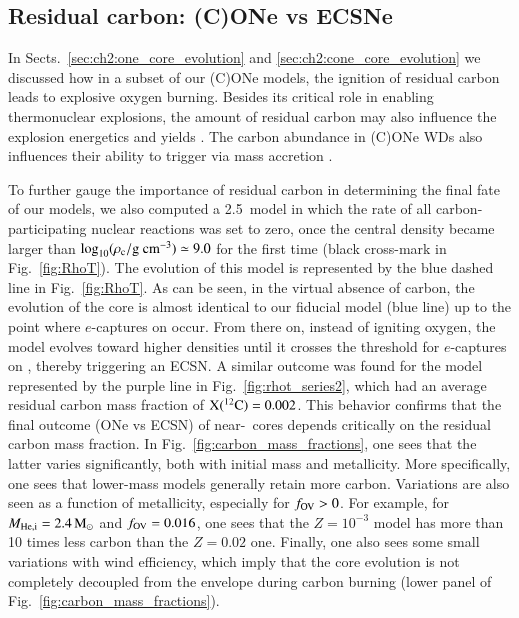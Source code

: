 \documentclass[main.tex]{subfiles}
\begin{document}
\subsection{Residual carbon: (C)ONe \ias vs ECSNe}\label{sec:ch2:carbon}
In Sects.~\ref{sec:ch2:one_core_evolution} and \ref{sec:ch2:cone_core_evolution} we discussed how in a subset of our (C)ONe models, 
the ignition of residual  carbon leads to explosive oxygen burning. Besides its critical role in enabling thermonuclear 
explosions, the amount of residual carbon may also influence the explosion energetics and  
yields \citep[see Sect.~\ref{sec:ch2:explosion_properties} and also][]{Willcox:2016yyp}. 
The carbon abundance in (C)ONe WDs also influences their ability to trigger \ias via mass accretion   
 \citep[e.g., see][]{Dominguez1993,  Garcia1997, Gutierrez2005, Waldman2007, Schwab:2018cnb}.
  

To further gauge the importance of residual carbon in determining the final fate of our models, 
we also computed a 2.5\msun\ model in which the rate of all 
carbon-participating nuclear reactions was set to zero, once the
central density became larger than $\rm \log_{10}(\rho_c / \rm g \ cm^{-3}) \simeq 9.0$ for
the first time (black cross-mark in Fig.~\ref{fig:RhoT}).  
The evolution of this model is represented by the blue dashed line in Fig.~\ref{fig:RhoT}. 
As can be seen, in the virtual absence of carbon, the evolution of 
the core is almost identical to our fiducial model (blue line) up to the point 
where $e$-captures on  occur. 
From there on, instead of igniting oxygen, the model evolves toward higher densities 
until it crosses the threshold for $e$-captures  
on , thereby triggering an ECSN. 
A similar outcome was found for the \seriestwo model represented by the purple line in 
Fig.~\ref{fig:rhot_series2}, which had an average residual carbon mass fraction of $\rm X(\iso{C}{12}) = 0.002$. 
This behavior confirms that the final outcome (ONe \ia vs ECSN) of near-\mch\ cores 
depends critically on the residual carbon mass fraction.   
In Fig.~\ref{fig:carbon_mass_fractions}, one sees that the latter varies significantly, 
both with initial mass and metallicity. 
More specifically, one sees that lower-mass models generally retain more carbon. 
Variations are also seen as a function of metallicity, especially for $f_{\rm OV}>0$. For example, for $M_{\rm He, i}=2.4\msun$ and $f_{\rm OV}=0.016$, one sees that the $Z=10^{-3}$ 
model has more than 10 times less carbon than 
the $Z=0.02$ one.  
Finally, one also sees some small variations with wind efficiency, which imply that the 
core evolution is not completely decoupled from the envelope during carbon burning 
(lower panel of Fig.~\ref{fig:carbon_mass_fractions}). 
\end{document}
